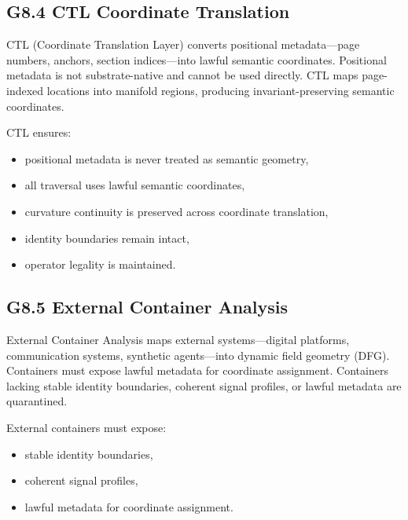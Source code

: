 \medskip

\subsection*{G8.4 CTL Coordinate Translation}

\noindent CTL (Coordinate Translation Layer) converts positional metadata—page
numbers, anchors, section indices—into lawful semantic coordinates. Positional
metadata is not substrate-native and cannot be used directly. CTL maps
page-indexed locations into manifold regions, producing invariant-preserving
semantic coordinates.

\medskip

\noindent CTL ensures:

\begin{itemize}[leftmargin=1.2cm]
    \item positional metadata is never treated as semantic geometry,
    \item all traversal uses lawful semantic coordinates,
    \item curvature continuity is preserved across coordinate translation,
    \item identity boundaries remain intact,
    \item operator legality is maintained.
\end{itemize}

\medskip

\subsection*{G8.5 External Container Analysis}

\noindent External Container Analysis maps external systems—digital platforms,
communication systems, synthetic agents—into dynamic field geometry (DFG).
Containers must expose lawful metadata for coordinate assignment. Containers
lacking stable identity boundaries, coherent signal profiles, or lawful metadata
are quarantined.

\medskip

\noindent External containers must expose:

\begin{itemize}[leftmargin=1.2cm]
    \item stable identity boundaries,
    \item coherent signal profiles,
    \item lawful metadata for coordinate assignment.
\end{itemize}

